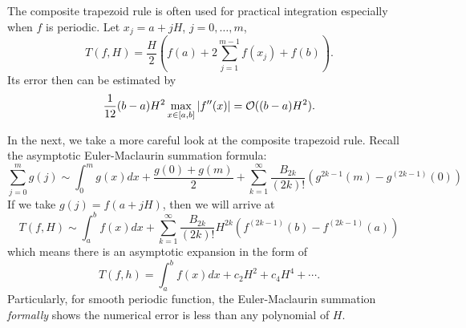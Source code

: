 \begin{example}
    The composite trapezoid rule is often used for practical integration especially when $f$ is periodic. Let $x_j = a + j H$, $j=0,\dots, m$, 
    $$T(f, H) = \frac{H}{2} \left(   f(a) + 2\sum_{j=1}^{m-1} f(x_j)  + f(b)  \right).$$
    Its error then can be estimated by
    \begin{equation}
        \frac{1}{12} (b-a) H^{2} \max_{x\in[a,b]} |f''(x)| =\mathcal O((b-a)H^2).
    \end{equation}

\end{example}
In the next, we take a more careful look at the composite trapezoid rule. Recall the asymptotic Euler-Maclaurin summation formula: 
\begin{equation}
\sum_{j=0}^m g(j) \sim \int_0^m g(x) dx + \frac{g(0) + g(m)}{2} + \sum_{k=1}^{\infty} \frac{B_{2k}}{(2k)!}(g^{{2k-1}}(m) - g^{(2k-1)}(0))
\end{equation}
If we take $g(j) = f(a + jH)$, then we will arrive at 
\begin{equation}
    T(f, H)\sim \int_a^b f(x) dx + \sum_{k=1}^{\infty} \frac{B_{2k}}{(2k)!} H^{2k}\left(f^{(2k-1)}(b) - f^{(2k-1)}(a) \right) 
\end{equation}
which means there is an asymptotic expansion in the form of 
\begin{equation}\label{EQ: TRAP EXP}
    T(f, h) = \int_a^b f(x) dx + c_2 H^2 + c_4 H^4 + \cdots.
\end{equation}
Particularly, for smooth periodic function, the Euler-Maclaurin summation \emph{formally} shows the numerical error is less than any polynomial of $H$.
